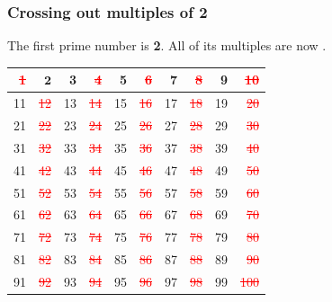 \documentclass[12pt]{book}
\newcommand{\crossout}[1]{\textcolor{red}{\sout{#1}}}
\begin{document}
  \subsubsection*{Crossing out multiples of 2}

  The first prime number is \textbf{2}. All of its multiples are now .

  \begin{center}
  \renewcommand{\arraystretch}{1.15}
  \begin{tabular}{|*{10}{r|}}
    \hline 
    \cellcolor{gray!25}\crossout{1}   & \(\mathbf{2}\) & 3 & \crossout{4} & 5 & \crossout{6} & 7 & \crossout{8} & 9 & \crossout{10} \\
    \hline 
    11 & \crossout{12} & 13 & \crossout{14} & 15 & \crossout{16} & 17 & \crossout{18} & 19 & \crossout{20} \\
    \hline 
    21 & \crossout{22} & 23 & \crossout{24} & 25 & \crossout{26} & 27 & \crossout{28} & 29 & \crossout{30} \\
    \hline 
    31 & \crossout{32} & 33 & \crossout{34} & 35 & \crossout{36} & 37 & \crossout{38} & 39 & \crossout{40} \\
    \hline 
    41 & \crossout{42} & 43 & \crossout{44} & 45 & \crossout{46} & 47 & \crossout{48} & 49 & \crossout{50} \\
    \hline 
    51 & \crossout{52} & 53 & \crossout{54} & 55 & \crossout{56} & 57 & \crossout{58} & 59 & \crossout{60} \\
    \hline 
    61 & \crossout{62} & 63 & \crossout{64} & 65 & \crossout{66} & 67 & \crossout{68} & 69 & \crossout{70} \\
    \hline 
    71 & \crossout{72} & 73 & \crossout{74} & 75 & \crossout{76} & 77 & \crossout{78} & 79 & \crossout{80} \\
    \hline 
    81 & \crossout{82} & 83 & \crossout{84} & 85 & \crossout{86} & 87 & \crossout{88} & 89 & \crossout{90} \\
    \hline 
    91 & \crossout{92} & 93 & \crossout{94} & 95 & \crossout{96} & 97 & \crossout{98} & 99 & \crossout{100} \\
    \hline 
  \end{tabular}
  \end{center}
  \newpage
\end{document}
